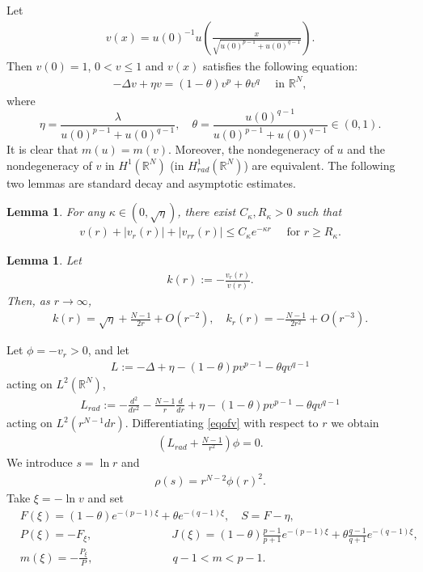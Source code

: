 \documentclass{article}
\newtheorem{lemma}[theorem]{Lemma}
\theoremstyle{definition} \theoremstyle{remark}
\numberwithin{equation}{section}
\newcommand{\R}{\mathbb{R}}
\newcommand{\la}{\lambda}
\begin{document}
	Let
	\begin{align} \label{scalingv}
		v(x) = u(0)^{-1}u\left(\frac{x}{\sqrt{u(0)^{p-1}+u(0)^{q-1}}}\right).
	\end{align}
	Then $v(0) = 1$, $0 < v \le 1$ and $v(x)$ satisfies the following equation:
	\begin{align} \label{eqofv}
		-\Delta v + \eta v = (1-\theta)v^p + \theta v^q \quad \text{ in } \R^N,
	\end{align}
	where
	$$
	\eta = \frac{\la}{u(0)^{p-1}+u(0)^{q-1}}, \quad \theta = \frac{u(0)^{q-1}}{u(0)^{p-1}+u(0)^{q-1}} \in (0,1).
	$$
	It is clear that $m(u) = m(v)$. Moreover,  the nondegeneracy of $u$ and the nondegeneracy of $v$ in $H^1(\R^N)$ (in $H_{rad}^1(\R^N)$) are equivalent.
The following two lemmas are standard decay and asymptotic estimates.

	\begin{lemma}
		For any $\kappa \in (0,\sqrt{\eta})$, there exist $C_\kappa, R_\kappa > 0$ such that
		\begin{align*}
			v(r) + |v_r(r)| + |v_{rr}(r)| \le C_\kappa e^{-\kappa r} \quad \text{ for } r \ge R_\kappa.
		\end{align*}
	\end{lemma}

	\begin{lemma} \label{lemlimitofk}
		Let
		\begin{align*}
			k(r) := -\frac{v_r(r)}{v(r)}.
		\end{align*}
		Then, as $r \to \infty$,
		\begin{align*}
			k(r) = \sqrt{\eta} + \frac{N-1}{2r} + O(r^{-2}), \quad k_r(r) = -\frac{N-1}{2r^2} + O(r^{-3}).
		\end{align*}
	\end{lemma}

	Let $\phi = -v_r > 0$, and let
	\begin{align*}
		L := -\Delta + \eta - (1-\theta)pv^{p-1} - \theta q v^{q-1}
	\end{align*}
	acting on $L^2(\R^N)$,
	\begin{align*}
		L_{rad} := -\frac{d^2}{dr^2} - \frac{N-1}{r}\frac{d}{dr} + \eta - (1-\theta)pv^{p-1} - \theta q v^{q-1}
	\end{align*}
	acting on $L^2(r^{N-1}dr)$. Differentiating \eqref{eqofv} with respect to $r$ we obtain
	\begin{align} \label{eqofphi}
		\left(L_{rad} + \frac{N-1}{r^2}\right)\phi = 0.
	\end{align}
 	We introduce $s = \ln r$ and
	\begin{align*}
		\rho(s) = r^{N-2}\phi(r)^2.
	\end{align*}
	Take $\xi = -\ln v$ and set
	\begin{align*}
		& F(\xi) = (1-\theta)e^{-(p-1)\xi} + \theta e^{-(q-1)\xi}, \quad S = F -\eta, \\
		& P(\xi) = -F_\xi, \quad\quad\quad\quad\quad\quad\quad J(\xi) = (1-\theta)\frac{p-1}{p+1}e^{-(p-1)\xi} + \theta \frac{q-1}{q+1}e^{-(q-1)\xi}, \\
		& m(\xi) = -\frac{P_\xi}{P}, \quad\quad\quad\quad\quad\quad\quad q-1 < m < p-1.
	\end{align*}
\end{document}
